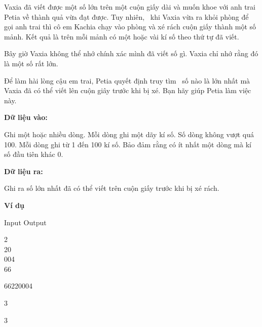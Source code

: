 



   Vaxia đã viết được một số lớn trên một cuộn giấy dài và muốn khoe với anh trai Petia về thành quả vừa đạt được. Tuy nhiên,  khi Vaxia vừa ra khỏi phòng để gọi anh trai thì cô em Kachia chạy vào phòng và xé rách cuộn giấy thành một số mảnh. Kết quả là trên mỗi mảnh có một hoặc vài kí số theo thứ tự đã viết.  

   Bây giờ Vaxia không thể nhớ chính xác mình đã viết số gì. Vaxia chỉ nhớ rằng đó là một số rất lớn.  

   Để làm hài lòng cậu em trai, Petia quyết định truy tìm  số nào là lớn nhất mà Vaxia đã có thể viết lên cuộn giây trước khi bị xé. Bạn hãy giúp Petia làm việc này.  

\textbf{Dữ liệu vào:}

   Ghi một hoặc nhiều dòng. Mỗi dòng ghi một dãy kí số. Số dòng không vượt quá 100. Mỗi dòng ghi từ 1 đến 100 kí số. Bảo đảm rằng có ít nhất một dòng mà kí số đầu tiên khác 0.  

\textbf{Dữ liệu ra:}

   Ghi ra số lớn nhất đã có thể viết trên cuộn giấy trước khi bị xé rách.  

\textbf{    Ví dụ   }

       Input                      Output                        

       2       
\\       20       
\\       004       
\\       66      

       66220004      

       3      

       3      
